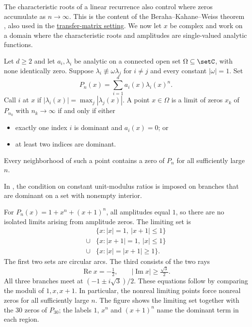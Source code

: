 The characteristic roots of a linear recurrence also control where zeros accumulate as
$n\to\infty$. This is the content of the Beraha--Kahane--Weiss theorem
\cite{Beraha75limits}, also used in the
\hyperref[berahaKahaneWeiss]{transfer-matrix setting}.
We now let $x$ be complex and work on a domain where the characteristic roots
and amplitudes are single-valued analytic functions.

\begin{theorem}
\label{toeplitzBkwTheorem}
Let $d\geq2$ and let $a_i,\lambda_i$ be analytic on a connected open set
$\Omega\subseteq\setC$, with none identically zero. Suppose
$\lambda_i\not\equiv\omega\lambda_j$ for $i\ne j$ and every constant
$|\omega|=1$. Set
\[
 P_n(x)=\sum_{i=1}^d a_i(x)\lambda_i(x)^n.
\]
Call $i$  at $x$ if
$|\lambda_i(x)|=\max_j|\lambda_j(x)|$.
A point $x\in\Omega$ is a limit of zeros $x_k$ of $P_{n_k}$ with
$n_k\to\infty$ if and only if either
\begin{itemize}
\item exactly one index $i$ is dominant and $a_i(x)=0$; or
\item at least two indices are dominant.
\end{itemize}
Every neighborhood of such a point contains a zero of $P_n$ for all
sufficiently large $n$.
\end{theorem}

In \cite[Thm.~1.5]{Sokal2004ChromaticRoots}, the condition on constant
unit-modulus ratios is imposed on branches that are dominant on a set
with nonempty interior.

\begin{example}
For $P_n(x)=1+x^n+(x+1)^n$, all amplitudes equal $1$, so there are no
isolated limits arising from amplitude zeros. The limiting set is
\begin{align*}
 &\{x:|x|=1,\ |x+1|\leq1\}\\
 {}\cup{}&\{x:|x+1|=1,\ |x|\leq1\}\\
 {}\cup{}&\{x:|x|=|x+1|\geq1\}.
\end{align*}
The first two sets are circular arcs. The third consists of the two rays
\[
 \operatorname{Re}x=-\tfrac12,\qquad
 |\operatorname{Im}x|\geq\tfrac{\sqrt3}{2}.
\]
All three branches meet at $(-1\pm i\sqrt3)/2$. These equations follow by
comparing the moduli of $1,x,x+1$. In particular, the nonreal limiting points
force nonreal zeros for all sufficiently large $n$.
The figure shows the limiting set together with the $30$ zeros of $P_{30}$;
the labels $1$, $x^n$ and $(x+1)^n$ name the dominant term in each region.
\begin{figure}
\end{figure}
\end{example}

